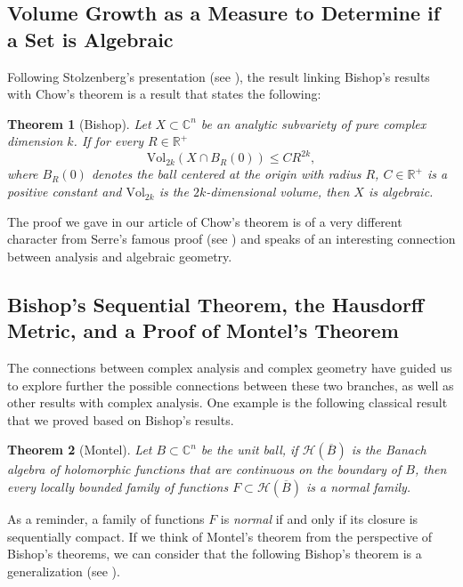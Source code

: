 \documentclass{article}
\newtheorem{theorem}{Theorem}
\newcommand{\con}{\ensuremath{\mathbb{C}^n}}
\newcommand{\re}{\ensuremath{\mathbb R }}
\begin{document}
\subsection{Volume Growth as a Measure to Determine if a Set is Algebraic}
\noindent Following Stolzenberg's presentation (see \cite{Stolzenberg}), the result linking
Bishop's results with Chow's theorem is a result that states the following:
\begin{theorem}[Bishop]\label{Bishop1}
        Let $X\subset\con$ be an analytic subvariety of pure complex dimension $k$. If for every $R\in\re^+$
        $$\textrm{Vol}_{2k}(X\cap B_R(0))\leq CR^{2k},$$
        where $B_R(0)$ denotes the ball centered at the origin with radius $R$, $C\in\re^{+}$ is a positive constant
        and $\textrm{Vol}_{2k}$ is the $2k$-dimensional volume, then $X$ is algebraic.
\end{theorem}
\noindent The proof we gave in our article of Chow's theorem is of a very different character from Serre's famous proof (see \cite{GAGA}) and speaks of an interesting connection between analysis and algebraic geometry.

\subsection{Bishop's Sequential Theorem, the Hausdorff Metric, and a Proof of Montel's Theorem}
\noindent The connections between complex analysis and complex geometry have guided us to explore further the possible connections between these two branches,
as well as other results with complex analysis. One example is the following classical result that we proved
based on Bishop's results.
\begin{theorem}[Montel]\label{Montel}
        Let $B\subset\con$ be the unit ball, if $\mathcal{H}(\overline{B})$ is the Banach algebra of holomorphic functions that are continuous
        on the boundary of $B$, then every locally bounded family of functions $F\subset\mathcal{H}(\overline{B})$ is a \textit{normal} family.
\end{theorem}
As a reminder, a family of functions $F$ is \textit{normal} if and only if its closure is sequentially compact.
If we think of Montel's theorem from the perspective of Bishop's theorems, we can consider that the following Bishop's theorem is a
generalization (see \cite[p. 30]{Stolzenberg}).
\end{document}
